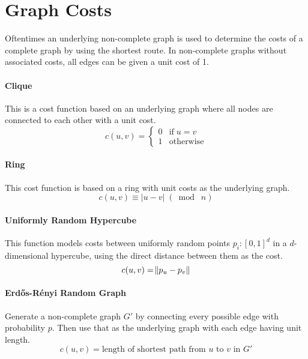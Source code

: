 \documentclass[a4paper, oneside]{discothesis}
\begin{document}
\section{Graph Costs}
\label{graph-costs}

Oftentimes an underlying non-complete graph is used to determine the costs of a complete graph by using the shortest route. In non-complete graphs without associated costs, all edges can be given a unit cost of 1.

\paragraph{Clique} This is a cost function based on an underlying graph where all nodes are connected to each other with a unit cost.
\begin{equation}
c(u,v)=
\begin{cases}
0 & \text{if}\;u=v \\
1 & \text{otherwise}
\end{cases}
\end{equation}

\paragraph{Ring} This cost function is based on a ring with unit costs as the underlying graph.
\begin{equation}
c(u,v)\equiv|u-v|\;(\bmod\;n)
\end{equation}

\paragraph{Uniformly Random Hypercube} This function models costs between uniformly random points $p_i:[0,1]^d$ in a $d$-dimensional hypercube, using the direct distance between them as the cost.
\begin{equation}
c(u,v)=\norm{p_u-p_v}
\end{equation}

\paragraph{Erdős-Rényi Random Graph} Generate a non-complete graph $G'$ by connecting every possible edge with probability $p$. Then use that as the underlying graph with each edge having unit length.
\begin{equation}
c(u,v)=\text{length of shortest path from $u$ to $v$ in $G'$}
\end{equation}
\end{document}
